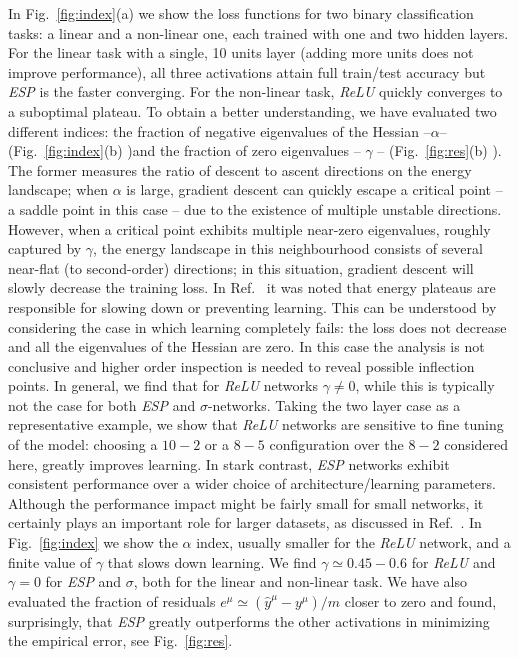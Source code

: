 \documentclass[5p]{elsarticle}
\begin{document}
In Fig.~\eqref{fig:index}(a) we show the loss functions for two binary classification tasks: a linear and a non-linear one, each trained with one and two hidden layers. For the linear task with a single, 10 units layer (adding more units does not improve performance), all three activations attain full train/test accuracy but {\it ESP} is the faster converging.  For the non-linear task, {\it ReLU} quickly converges to a suboptimal plateau. To obtain a better understanding, we have evaluated two different indices: the fraction of negative eigenvalues of the Hessian --$\alpha$--(Fig.~\ref{fig:index}(b) )and the fraction of zero eigenvalues -- $\gamma$ --  (Fig.~\ref{fig:res}(b) ). The former measures the ratio of descent to ascent directions on the energy landscape; when $\alpha$ is large, gradient descent can quickly escape a critical point -- a saddle point in this case --  due to the existence of multiple unstable directions. However, when a critical point exhibits multiple near-zero eigenvalues, roughly captured by $\gamma$, the energy landscape in this neighbourhood consists of several near-flat (to second-order) directions; in this situation, gradient descent will slowly decrease the training loss. In Ref.~\cite{dauphin} it was noted that energy plateaus are responsible for slowing down or preventing learning. This can be understood by considering the case in which learning completely fails: the loss does not decrease and all the eigenvalues of the Hessian are zero. In this case the analysis is not conclusive and higher order inspection is needed to reveal possible inflection points. In general, we find that  for {\it ReLU} networks $\gamma \neq 0$, while this is typically not the case for both {\it ESP} and $\sigma$-networks. Taking the two layer case as a representative example, we show that {\it ReLU} networks are sensitive to fine tuning of the model: choosing a $10-2$ or a $8-5$ configuration over the $8-2$ considered here, greatly improves learning. In stark contrast, {\it ESP} networks exhibit consistent performance over a wider choice of architecture/learning parameters. Although the performance impact might be fairly small for small networks, it certainly plays an important role for larger datasets, as discussed in Ref.~\cite{prajit}.
In Fig.~\eqref{fig:index} we show the $\alpha$ index, usually smaller for the {\it ReLU} network, and a finite value of $\gamma$ that slows down learning. We find $\gamma \simeq 0.45-0.6$ for {\it ReLU} and $\gamma=0$ for {\it ESP} and $\sigma$, both for the linear and non-linear task. We have also evaluated the fraction of residuals $e^{\mu} \simeq (\hat{y}^{\mu} - y^{\mu})/m$ closer to zero and found, surprisingly, that {\it ESP} greatly outperforms the other activations in minimizing the empirical error, see Fig.~\eqref{fig:res}.
\end{document}
